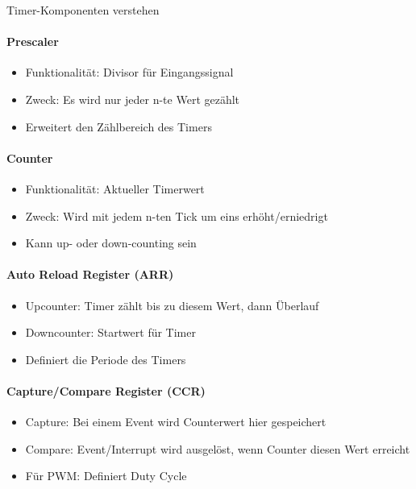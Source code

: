 \begin{KR}{Timer-Komponenten verstehen}
    \paragraph{Prescaler}
    \begin{itemize}
        \item Funktionalität: Divisor für Eingangssignal
        \item Zweck: Es wird nur jeder n-te Wert gezählt
        \item Erweitert den Zählbereich des Timers
    \end{itemize}
    
    \paragraph{Counter}
    \begin{itemize}
        \item Funktionalität: Aktueller Timerwert
        \item Zweck: Wird mit jedem n-ten Tick um eins erhöht/erniedrigt
        \item Kann up- oder down-counting sein
    \end{itemize}
    
    \paragraph{Auto Reload Register (ARR)}
    \begin{itemize}
        \item Upcounter: Timer zählt bis zu diesem Wert, dann Überlauf
        \item Downcounter: Startwert für Timer
        \item Definiert die Periode des Timers
    \end{itemize}
    
    \paragraph{Capture/Compare Register (CCR)}
    \begin{itemize}
        \item Capture: Bei einem Event wird Counterwert hier gespeichert
        \item Compare: Event/Interrupt wird ausgelöst, wenn Counter diesen Wert erreicht
        \item Für PWM: Definiert Duty Cycle
    \end{itemize}
\end{KR}

